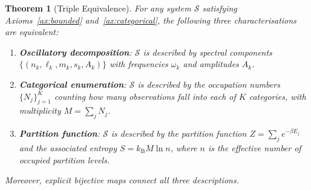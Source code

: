 \documentclass[11pt,twocolumn,a4paper]{article}
\newtheorem{theorem}{Theorem}[section]
\newcommand{\kb}{k_{\mathrm{B}}}
\begin{document}
\begin{theorem}[Triple Equivalence]
\label{thm:triple}
For any system $\mathcal{S}$ satisfying Axioms~\ref{ax:bounded}
and~\ref{ax:categorical}, the following three characterisations are
equivalent:
\begin{enumerate}[label=(\alph*),nosep]
  \item \textbf{Oscillatory decomposition}: $\mathcal{S}$ is described
    by spectral components $\{(n_k, \ell_k, m_k, s_k, A_k)\}$
    with frequencies $\omega_k$ and amplitudes $A_k$.
  \item \textbf{Categorical enumeration}: $\mathcal{S}$ is described by
    the occupation numbers $\{N_j\}_{j=1}^{K}$ counting how many
    observations fall into each of $K$ categories, with
    multiplicity $M = \sum_j N_j$.
  \item \textbf{Partition function}: $\mathcal{S}$ is described by the
    partition function $Z = \sum_j e^{-\beta E_j}$ and the associated
    entropy $S = \kb M \ln n$, where $n$ is the effective number of
    occupied partition levels.
\end{enumerate}
Moreover, explicit bijective maps connect all three descriptions.
\end{theorem}
\end{document}
